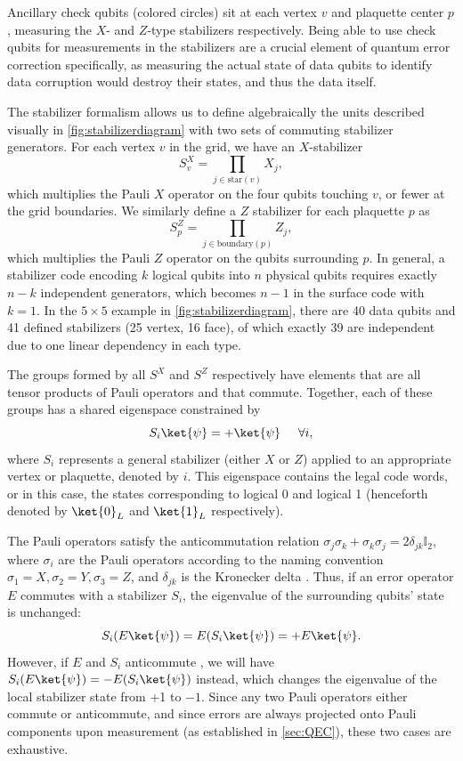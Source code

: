 Ancillary check qubits (colored circles) sit at each vertex $v$ and plaquette 
center $p$, measuring the $X$- and $Z$-type stabilizers respectively. Being able to use check qubits for measurements in the stabilizers are a crucial element of quantum error correction specifically, as measuring the actual state of data qubits to identify data corruption would destroy their states, and thus the data itself.

The stabilizer formalism allows us to define algebraically the units described visually in \cref{fig:stabilizerdiagram} with two sets of commuting stabilizer generators. For each vertex $v$ in the grid, we have an $X$-stabilizer
\[S^X_v = \prod_{j \in \text{star}(v)} X_j,\]
which multiplies the Pauli $X$ operator on the four qubits touching $v$, or fewer at the grid boundaries. We similarly define a $Z$ stabilizer for each plaquette $p$ as
\[S^Z_p = \prod_{j \in \text{boundary}(p)} Z_j,\]
which multiplies the Pauli $Z$ operator on the qubits surrounding $p$. In general, a stabilizer code encoding $k$ logical qubits into $n$ physical qubits requires exactly $n-k$ independent generators, which becomes $n-1$ in the surface code with $k=1$. In the $5\times5$ example in \cref{fig:stabilizerdiagram}, there are 40 data qubits and 41 defined stabilizers (25 vertex, 16 face), of which exactly 39 are independent due to one linear dependency in each type.

The groups formed by all $S^X$ and $S^Z$ respectively have elements that are all tensor products of Pauli operators and that commute. Together, each of these groups has a shared eigenspace constrained by 
\[S_i \ket{\psi} = + \ket{\psi} \hspace{0.5cm} \forall i,\]
where $S_i$ represents a general stabilizer (either $X$ or $Z$) applied to an appropriate vertex or plaquette, denoted by $i$. This eigenspace contains the legal code words, or in this case, the states corresponding to logical 0 and logical 1 (henceforth denoted by $\ket{0}_L$ and $\ket{1}_L$ respectively).

The Pauli operators satisfy the anticommutation relation $\sigma_j \sigma_k + \sigma_k \sigma_j  = 2\delta_{jk} \mathbb{I}_2$, where $\sigma_i$ are the Pauli operators according to the naming convention $\sigma_1 = X, \sigma_2 = Y, \sigma_3 = Z$, and $\delta_{jk}$ is the Kronecker delta \cite{paulimatrices}. Thus, if an error operator $E$ commutes with a stabilizer $S_i$, the eigenvalue of the surrounding qubits' state is unchanged:
\[
S_i(E\ket{\psi}) = E(S_i\ket{\psi}) = +E\ket{\psi}.
\]
However, if $E$ and $S_i$ anticommute , we will have $S_i(E\ket{\psi}) = -E(S_i\ket{\psi})$ instead, which changes the eigenvalue of the local stabilizer state from +1 to $-1$. Since any two Pauli operators either commute or anticommute, and since errors are always projected onto Pauli components upon measurement (as established in \cref{sec:QEC}), these two cases are exhaustive.

